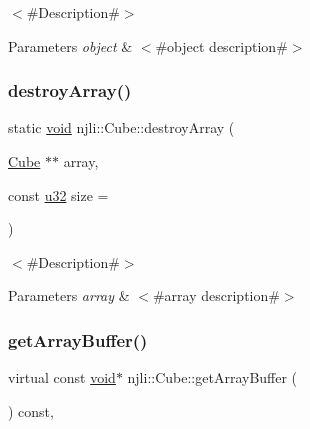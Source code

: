 $<$\#\+Description\#$>$


\begin{DoxyParams}{Parameters}
{\em object} & $<$\#object description\#$>$ \\
\hline
\end{DoxyParams}
\mbox{\label{classnjli_1_1_cube_a17131ffef5be91b5b1497dad7d377954}} 
\subsubsection{\texorpdfstring{destroy\+Array()}{destroyArray()}}
{\footnotesize\ttfamily static \mbox{\hyperlink{_thread_8h_af1e856da2e658414cb2456cb6f7ebc66}{void}} njli\+::\+Cube\+::destroy\+Array (\begin{DoxyParamCaption}\item[{\mbox{\hyperlink{classnjli_1_1_cube}{Cube}} $\ast$$\ast$}]{array,  }\item[{const \mbox{\hyperlink{_util_8h_a10e94b422ef0c20dcdec20d31a1f5049}{u32}}}]{size = {} }\end{DoxyParamCaption})\hspace{0.3cm}{\ttfamily [static]}}

$<$\#\+Description\#$>$


\begin{DoxyParams}{Parameters}
{\em array} & $<$\#array description\#$>$ \\
\hline
\end{DoxyParams}
\mbox{\label{classnjli_1_1_cube_a33f8ca33a86505fa1bbee02e7ae9ac77}} 
\subsubsection{\texorpdfstring{get\+Array\+Buffer()}{getArrayBuffer()}}
{\footnotesize\ttfamily virtual const \mbox{\hyperlink{_thread_8h_af1e856da2e658414cb2456cb6f7ebc66}{void}}$\ast$ njli\+::\+Cube\+::get\+Array\+Buffer (\begin{DoxyParamCaption}{ }\end{DoxyParamCaption}) const\hspace{0.3cm}{\ttfamily [protected]}, {\ttfamily [virtual]}}

